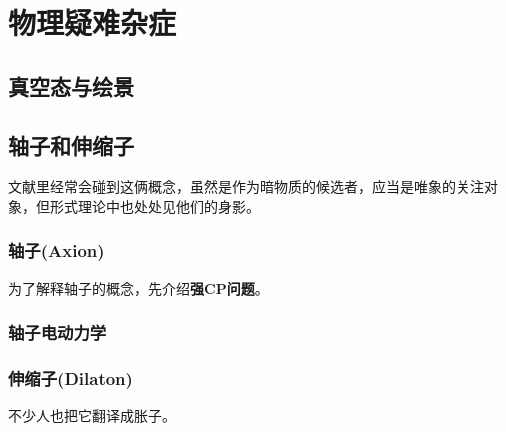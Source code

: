 \chapter{物理疑难杂症}
\section{真空态与绘景}
\section{轴子和伸缩子}
文献里经常会碰到这俩概念，虽然是作为暗物质的候选者，应当是唯象的关注对象，但形式理论中也处处见他们的身影。
\subsection{轴子(Axion)}
为了解释轴子的概念，先介绍\textbf{强CP问题}。

\subsection{轴子电动力学}

\subsection{伸缩子(Dilaton)}
不少人也把它翻译成胀子。